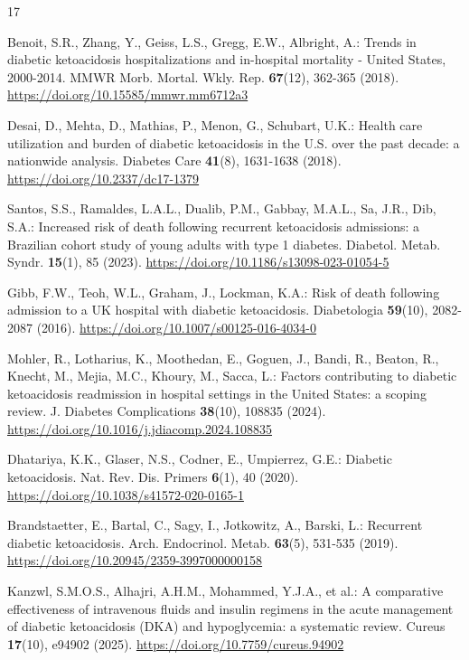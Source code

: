 \documentclass[pdflatex,sn-basic,Numbered]{sn-jnl}
\begin{document}
\begin{thebibliography}{17}

 Benoit, S.R., Zhang, Y., Geiss, L.S., Gregg, E.W., Albright, A.: Trends in diabetic ketoacidosis hospitalizations and in-hospital mortality - United States, 2000-2014. MMWR Morb. Mortal. Wkly. Rep. \textbf{67}(12), 362-365 (2018). \url{https://doi.org/10.15585/mmwr.mm6712a3}

 Desai, D., Mehta, D., Mathias, P., Menon, G., Schubart, U.K.: Health care utilization and burden of diabetic ketoacidosis in the U.S. over the past decade: a nationwide analysis. Diabetes Care \textbf{41}(8), 1631-1638 (2018). \url{https://doi.org/10.2337/dc17-1379}

 Santos, S.S., Ramaldes, L.A.L., Dualib, P.M., Gabbay, M.A.L., Sa, J.R., Dib, S.A.: Increased risk of death following recurrent ketoacidosis admissions: a Brazilian cohort study of young adults with type 1 diabetes. Diabetol. Metab. Syndr. \textbf{15}(1), 85 (2023). \url{https://doi.org/10.1186/s13098-023-01054-5}

 Gibb, F.W., Teoh, W.L., Graham, J., Lockman, K.A.: Risk of death following admission to a UK hospital with diabetic ketoacidosis. Diabetologia \textbf{59}(10), 2082-2087 (2016). \url{https://doi.org/10.1007/s00125-016-4034-0}

 Mohler, R., Lotharius, K., Moothedan, E., Goguen, J., Bandi, R., Beaton, R., Knecht, M., Mejia, M.C., Khoury, M., Sacca, L.: Factors contributing to diabetic ketoacidosis readmission in hospital settings in the United States: a scoping review. J. Diabetes Complications \textbf{38}(10), 108835 (2024). \url{https://doi.org/10.1016/j.jdiacomp.2024.108835}

 Dhatariya, K.K., Glaser, N.S., Codner, E., Umpierrez, G.E.: Diabetic ketoacidosis. Nat. Rev. Dis. Primers \textbf{6}(1), 40 (2020). \url{https://doi.org/10.1038/s41572-020-0165-1}

 Brandstaetter, E., Bartal, C., Sagy, I., Jotkowitz, A., Barski, L.: Recurrent diabetic ketoacidosis. Arch. Endocrinol. Metab. \textbf{63}(5), 531-535 (2019). \url{https://doi.org/10.20945/2359-3997000000158}

 Kanzwl, S.M.O.S., Alhajri, A.H.M., Mohammed, Y.J.A., et al.: A comparative effectiveness of intravenous fluids and insulin regimens in the acute management of diabetic ketoacidosis (DKA) and hypoglycemia: a systematic review. Cureus \textbf{17}(10), e94902 (2025). \url{https://doi.org/10.7759/cureus.94902}


\end{thebibliography}
\end{document}
